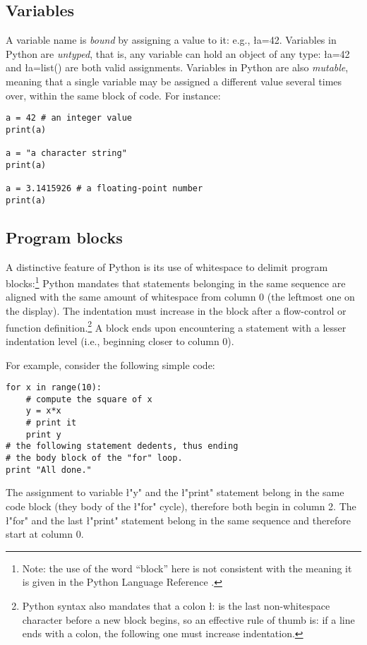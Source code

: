 \subsection{Variables}
\label{sec:variables}

A variable name is \emph{bound} by assigning a value to it: e.g.,
\l{a=42}.  Variables in Python are \emph{untyped}, that is, any
variable can hold an object of any type: \l{a=42} and \l{a=list()}
are both valid assignments. Variables in Python are also
\emph{mutable}, meaning that a single variable may be assigned a
different value several times over, within the same block of code.
For instance:
\begin{lstlisting}
a = 42 # an integer value
print(a)

a = "a character string"
print(a)

a = 3.1415926 # a floating-point number
print(a)
\end{lstlisting}


\subsection{Program blocks}
\label{sec:blocks}

A distinctive feature of Python is its use of whitespace to delimit
program blocks:\footnote{Note: the use of the word ``block'' here is
  not consistent with the meaning it is given in the Python Language
  Reference \cite{python:reference}.}  
Python mandates that statements belonging in the same sequence are
aligned with the same amount of whitespace from column 0 (the leftmost
one on the display).  The indentation must increase in the block after
a flow-control or function definition.\footnote{Python syntax also
  mandates that a colon \l{:} is the last non-whitespace character
  before a new block begins, so an effective rule of thumb is: if a
  line ends with a colon, the following one must increase
  indentation.}  A block ends upon encountering a statement with a
lesser indentation level (i.e., beginning closer to column 0).

For example, consider the following simple code:
\begin{lstlisting}
for x in range(10):
    # compute the square of x
    y = x*x
    # print it
    print y
# the following statement dedents, thus ending
# the body block of the "for" loop.
print "All done."
\end{lstlisting}
The assignment to variable \l"y" and the \l"print"
statement belong in the same code block (they body of the
\l"for" cycle), therefore both begin in column 2.  The
\l"for" and the last \l"print" statement belong in
the same sequence and therefore start at column 0. 


